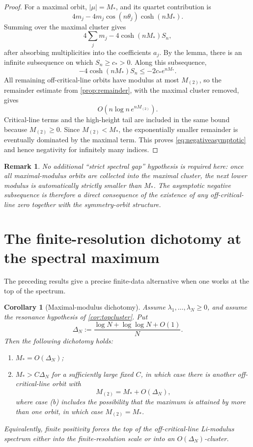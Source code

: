 \documentclass[11pt]{article}
\newtheorem{corollary}[theorem]{Corollary}
\newtheorem{remark}[theorem]{Remark}
\newcommand{\Li}{\lambda}
\begin{document}
\begin{proof}
For a maximal orbit, \(|\mu|=M_*\), and its quartet contribution is
\[
4m_j-4m_j\cos(n\theta_j)\cosh(nM_*).
\]
Summing over the maximal cluster gives
\[
4\sum_jm_j-4\cosh(nM_*)S_n,
\]
after absorbing multiplicities into the coefficients \(a_j\). By the lemma, there is an infinite subsequence on which \(S_n\ge c_*>0\). Along this subsequence,
\[
-4\cosh(nM_*)S_n
\le -2c_*e^{nM_*}.
\]
All remaining off-critical-line orbits have modulus at most \(M_{(2)}\), so the remainder estimate from \cref{prop:remainder}, with the maximal cluster removed, gives
\[
O\left(n\log n\,e^{nM_{(2)}}\right).
\]
Critical-line terms and the high-height tail are included in the same bound because \(M_{(2)}\ge0\). Since \(M_{(2)}<M_*\), the exponentially smaller remainder is eventually dominated by the maximal term. This proves \eqref{eq:negativeasymptotic} and hence negativity for infinitely many indices.
\end{proof}

\begin{remark}
No additional ``strict spectral gap'' hypothesis is required here: once all maximal-modulus orbits are collected into the maximal cluster, the next lower modulus is automatically strictly smaller than \(M_*\). The asymptotic negative subsequence is therefore a direct consequence of the existence of any off-critical-line zero together with the symmetry-orbit structure.
\end{remark}

\section{The finite-resolution dichotomy at the spectral maximum}

The preceding results give a precise finite-data alternative when one works at the top of the spectrum.

\begin{corollary}[Maximal-modulus dichotomy]
Assume \(\Li_1,\ldots,\Li_N\ge0\), and assume the resonance hypothesis of \cref{cor:topcluster}. Put
\[
\Delta_N:=\frac{\log N+\log\log N+O(1)}{N}.
\]
Then the following dichotomy holds:
\begin{enumerate}[label=(\alph*)]
\item \(M_*=O(\Delta_N)\);
\item \(M_*>C\Delta_N\) for a sufficiently large fixed \(C\), in which case there is another off-critical-line orbit with
\[
M_{(2)}=M_*+O(\Delta_N),
\]
where case (b) includes the possibility that the maximum is attained by more than one orbit, in which case \(M_{(2)}=M_*\).
\end{enumerate}
Equivalently, finite positivity forces the top of the off-critical-line Li-modulus spectrum either into the finite-resolution scale or into an \(O(\Delta_N)\)-cluster.
\end{corollary}
\end{document}

